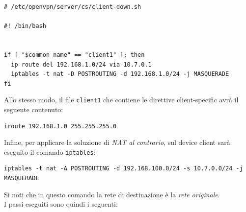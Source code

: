 \begin{verbatim}
# /etc/openvpn/server/cs/client-down.sh

#! /bin/bash


if [ "$common_name" == "client1" ]; then
  ip route del 192.168.1.0/24 via 10.7.0.1
  iptables -t nat -D POSTROUTING -d 192.168.1.0/24 -j MASQUERADE
fi
\end{verbatim}
Allo stesso modo, il file \texttt{client1} che contiene le direttive client-specific
avrà il seguente contenuto:
\begin{verbatim}
iroute 192.168.1.0 255.255.255.0
\end{verbatim}
Infine, per applicare la soluzione di \textit{NAT al contrario}, sul device client
sarà eseguito il comando \texttt{iptables}:
\begin{verbatim}
iptables -t nat -A POSTROUTING -d 192.168.100.0/24 -s 10.7.0.0/24 -j MASQUERADE
\end{verbatim}
Si noti che in questo comando la rete di destinazione è la \textit{rete originale}.\\
 I passi eseguiti sono quindi i seguenti:
